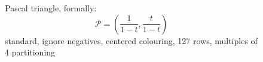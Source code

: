 
\begin{figure}[p]

    \noindent{}

    \captionsetup{singlelinecheck=off}
    \caption[$\mathcal{P}_{\stackrel{\circ}{\equiv_{4}}}$]{
        Pascal triangle, formally: 
        \begin{displaymath}
            \mathcal{P}=\left(\frac{1}{1-t}, \frac{t}{1-t}\right)
        \end{displaymath} %
        standard, ignore negatives, centered colouring, 127 rows, multiples of 4 partitioning
        }

    \label{fig:pascal-standard-ignore-negatives-centered-colouring-127-rows-multiples-of-4-partitioning-triangle}

\end{figure}

